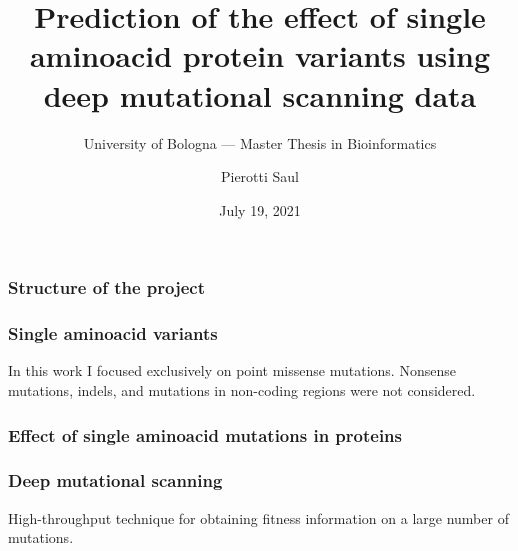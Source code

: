 \documentclass[10pt, british]{beamer}
\title[Single aminoacid variants prediction]{Prediction of the effect of single aminoacid protein
	variants using deep mutational scanning data}
\subtitle[]{University of Bologna --- Master Thesis in Bioinformatics}
\author[Pierotti Saul]{Pierotti Saul}
\date{July 19, 2021}
\begin{document}
\begin{frame}[plain]
	\titlepage%
\end{frame}

\begin{frame}
	\frametitle{Structure of the project}
	\begin{figure}
		
	\end{figure}
\end{frame}

\begin{frame}
	\frametitle{Single aminoacid variants}
	In this work I focused exclusively on point missense mutations.
	Nonsense mutations, indels, and mutations in non-coding regions were not considered.
	\vfill%
	\begin{figure}
		
	\end{figure}
\end{frame}

\begin{frame}
	\frametitle{Effect of single aminoacid mutations in proteins}
	\begin{figure}
		
	\end{figure}
\end{frame}

\begin{frame}
	\frametitle{Deep mutational scanning}
	High-throughput technique for obtaining fitness information on a large number of mutations.
	\vfill%
	\begin{figure}
		
	\end{figure}
\end{frame}

%
%
%
%
\end{document}
